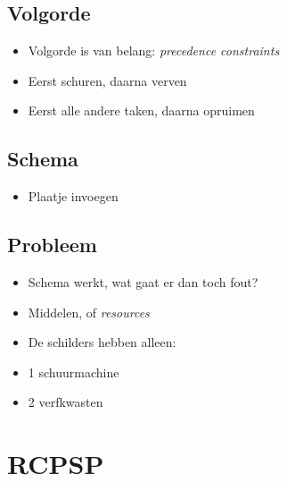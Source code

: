 \documentclass{beamer}
\theoremstyle{definition}
\begin{document}
\subsection{Volgorde}
\begin{frame}
	\begin{itemize}
		\item Volgorde is van belang: \emph{precedence constraints}
		\item Eerst schuren, daarna verven
		\item Eerst alle andere taken, daarna opruimen
	\end{itemize}
\end{frame}

\subsection{Schema}
\begin{frame}
	\begin{itemize}
		\item Plaatje invoegen
	\end{itemize}
\end{frame}

\subsection{Probleem}
\begin{frame}
	\begin{itemize}
		\item Schema werkt, wat gaat er dan toch fout?
		\item Middelen, of \emph{resources}
		\item De schilders hebben alleen:
		\item 1 schuurmachine
		\item 2 verfkwasten
	\end{itemize}
\end{frame}

\section{RCPSP}

\end{document}
